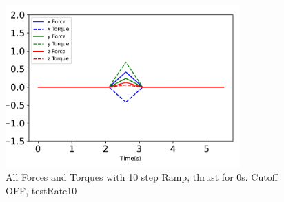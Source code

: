 \begin{figure}[htbp]\centerline{\includegraphics[width=0.8\textwidth]{AutoTeX/Ramp_10steps_CutoffOFF_0s_testRate10}}\caption{All Forces and Torques with 10 step Ramp, thrust for 0s. Cutoff OFF, testRate10}\label{fig:Ramp_10steps_CutoffOFF_0s_testRate10}\end{figure}